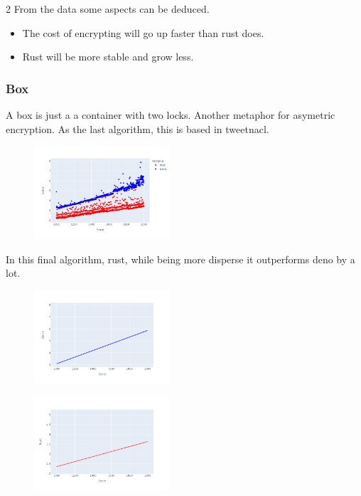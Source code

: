 \documentclass[12pt, letterpaper]{article}
\begin{document}
\begin{multicols}{2}
    From the data some aspects can be deduced.
    \begin{itemize}
        \item The cost of encrypting will go up faster than rust does.
        \item Rust will be more stable and grow less.
    \end{itemize}

    \subsubsection{Box}

    A box is just a a container with two locks. Another metaphor for asymetric encryption. As the last algorithm, this is based in tweetnacl.

    \begin{figure}[H]
        \centering
        \includegraphics[width=0.45\textwidth]{images/box_lines}
    \end{figure}

    In this final algorithm, rust, while being more disperse it outperforms deno by a lot.

    \begin{figure}[H]
        \centering
        \includegraphics[width=0.45\textwidth]{trend_box_deno}
    \end{figure}

    \begin{figure}[H]
        \centering
        \includegraphics[width=0.45\textwidth]{images/trend_box_rust}
    \end{figure}


\end{multicols}
\end{document}
